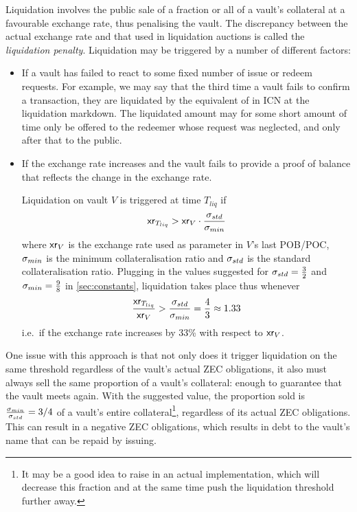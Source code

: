 Liquidation involves the public sale of a fraction or all of a vault's collateral at a favourable exchange rate, thus penalising the vault.
The discrepancy between the actual exchange rate and that used in liquidation auctions is called the \emph{liquidation penalty}.
Liquidation may be triggered by a number of different factors:
\begin{itemize}
    \item If a vault has failed to react to some fixed number of issue or redeem requests.
    For example, we may say that the third time a vault fails to confirm a \burn transaction, they are liquidated by the equivalent of \vmax in ICN at the liquidation markdown.
    The liquidated amount may for some short amount of time only be offered to the redeemer whose request was neglected, and only after that to the public.
    
    \item If the exchange rate increases and the vault fails to provide a proof of balance that reflects the change in the exchange rate.
    
    Liquidation on vault $V$ is triggered at time $T_{liq}$ if
    \[
        \mathsf{xr}_{T_{liq}} > \mathsf{xr}_{V} \cdot \frac{\sigma_{std}}{\sigma_{min}}
    \]
    where $\mathsf{xr}_{V}$ is the exchange rate used as parameter in $V$'s last POB/POC, $\sigma_{min}$ is the minimum collateralisation ratio and $\sigma_{std}$ is the standard collateralisation ratio.
    Plugging in the values suggested for $\sigma_{std} = \frac{3}{2}$ and $\sigma_{min} = \frac{9}{8}$ in \cref{sec:constants}, liquidation takes place thus whenever
    \[
        \frac{\mathsf{xr}_{T_{liq}}}{\mathsf{xr}_{V}} > \frac{\sigma_{std}}{\sigma_{min}} = \frac{4}{3} \approx 1.33
    \]
    i.e.\ if the exchange rate increases by 33\% with respect to $\mathsf{xr}_{V}$.
\end{itemize}

One issue with this approach is that not only does it trigger liquidation on the same threshold regardless of the vault's actual ZEC obligations, it also must always sell the same proportion of a vault's collateral: enough to guarantee that the vault meets \sstd again.
With the suggested value, the proportion sold is $\frac{\sigma_{min}}{\sigma_{std}} = 3/4$ of a vault's entire collateral\footnote{It may be a good idea to raise \sstd in an actual implementation, which will decrease this fraction and at the same time push the liquidation threshold further away.}, regardless of its actual ZEC obligations.  This can result in a negative ZEC obligations, which results in debt to the vault’s name that can be repaid by issuing.


